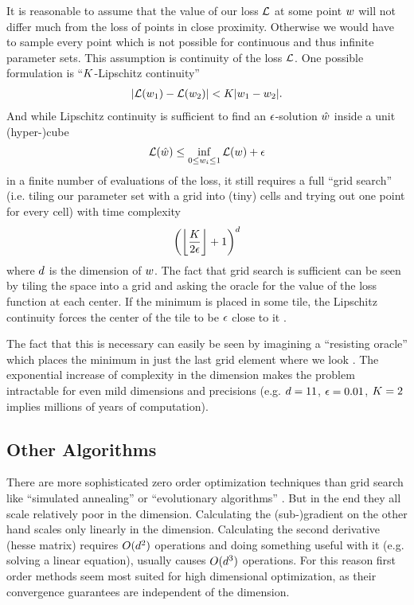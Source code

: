 It is reasonable to assume that the value of our loss \(\mathcal{L}\) at some point
\(w\) will not differ much from the loss of points in close proximity.
Otherwise we would have to sample every point which is not possible for continuous
and thus infinite parameter sets. This assumption is continuity of the loss
\(\mathcal{L}\). One possible formulation is ``\(K\)-Lipschitz continuity''
%
\begin{align*}
	| \mathcal{L}(w_1) - \mathcal{L}(w_2) | < K | w_1 - w_2 |.
\end{align*}
%
And while Lipschitz continuity is sufficient to find an \(\epsilon\)-solution
\(\hat{w}\) inside a unit (hyper-)cube
%
\begin{align*}
	\mathcal{L}(\hat{w}) \le \inf_{ 0\le w_i\le 1} \mathcal{L}(w) + \epsilon
\end{align*}
%
in a finite number of evaluations of the loss, it still requires a full
``grid search'' (i.e. tiling our parameter set with a grid into (tiny) cells
and trying out one point for every cell) with time complexity \parencite[pp.
12,13]{nesterovLecturesConvexOptimization2018}
%
\begin{align*}
	\left(\left\lfloor \frac{K}{2\epsilon}\right\rfloor + 1\right)^d
\end{align*}
%
where \(d\) is the dimension of \(w\). The fact that grid search is
sufficient can be seen by tiling the space into a grid and asking the oracle
for the value of the loss function at each center. If the minimum is placed in
some tile, the Lipschitz continuity forces the center of the tile to be \(\epsilon\)
close to it \parencite[cf.][p. 11]{nesterovLecturesConvexOptimization2018}.

The fact that this is necessary can easily be seen by imagining a ``resisting
oracle'' which places the minimum in just the last grid element where we look
\parencite[cf.][p. 13]{nesterovLecturesConvexOptimization2018}. The exponential
increase of complexity in the dimension makes the problem intractable for even
mild dimensions and precisions (e.g. \(d=11\), \(\epsilon=0.01\), \(K=2\)
implies millions of years of computation).

\subsection{Other Algorithms}

There are more sophisticated zero order optimization techniques than grid
search like ``simulated annealing'' \parencite[e.g.][]{bouttierConvergenceRateSimulated2019}
or ``evolutionary algorithms'' \parencite[e.g.][]{heConditionsConvergenceEvolutionary2001}.
But in the end they all scale relatively poor in the dimension. Calculating the
\mbox{(sub-)gradient} on the other hand scales only linearly in the dimension.
Calculating the second derivative (hesse matrix) requires \(O(d^2)\)
operations and doing something useful with it (e.g. solving a linear
equation), usually causes \(O(d^3)\) operations. For this reason first
order methods seem most suited for high dimensional optimization, as their
convergence guarantees are independent of the dimension.

